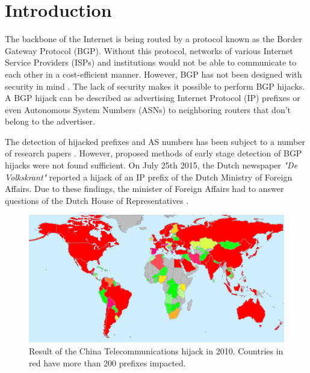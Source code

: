 \chapter{Introduction}\label{ch:introduction}
The backbone of the Internet is being routed by a protocol known as the Border Gateway Protocol (BGP). Without this protocol, networks of various Internet Service Providers (ISPs) and institutions would not be able to communicate to each other in a cost-efficient manner. However, BGP has not been designed with security in mind \cite{rekhter2006rfc}. The lack of security makes it possible to perform BGP hijacks. A BGP hijack can be described as advertising Internet Protocol (IP) prefixes or even Autonomous System Numbers (ASNs) to neighboring routers that don't belong to the advertiser.\\\par

The detection of hijacked prefixes and AS numbers has been subject to a number of research papers \cite{hu2007accurate}\cite{zheng2007light}. However, proposed methods of early stage detection of BGP hijacks were not found sufficient. On July 25th 2015, the Dutch newspaper \textit{"De Volkskrant"} reported a hijack of an IP prefix of the Dutch Ministry of Foreign Affairs. Due to these findings, the minister of Foreign Affairs had to answer questions of the Dutch House of Representatives \cite{koenders2015response}.\\\par

\begin{figure}[htbp]
    \vspace{2.0cm}
    \centering
    \includegraphics[scale=0.6]{images/prefixhj.png}
    \caption{Result of the China Telecommunications hijack in 2010. Countries in red have more than 200 prefixes impacted. \cite{prefixhj}}
    \label{fig:prefixhj}
\end{figure}
\newpage


